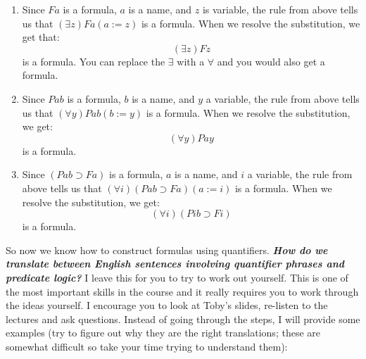 \documentclass[
]{book}
\begin{document}
\begin{enumerate}
\def\labelenumi{\arabic{enumi}.}
\item
  Since \(Fa\) is a formula, \(a\) is a name, and \(z\) is variable, the rule from above tells us that \((\exists z)Fa(a:=z)\) is a formula. When we resolve the substitution, we get that:
  \[
  (\exists z)Fz
  \]
  is a formula. You can replace the \(\exists\) with a \(\forall\) and you would also get a formula.
\item
  Since \(Pab\) is a formula, \(b\) is a name, and \(y\) a variable, the rule from above tells us that \((\forall y)Pab(b:=y)\) is a formula. When we resolve the substitution, we get:
  \[
  (\forall y)Pay
  \]
  is a formula.
\item
  Since \((Pab \supset Fa)\) is a formula, \(a\) is a name, and \(i\) a variable, the rule from above tells us that \((\forall i)(Pab\supset Fa)(a:=i)\) is a formula. When we resolve the substitution, we get:
  \[
  (\forall i)(Pib \supset Fi)
  \]
  is a formula.
\end{enumerate}

So now we know how to construct formulas using quantifiers. \textbf{\emph{How do we translate between English sentences involving quantifier phrases and predicate logic?}} I leave this for you to try to work out yourself. This is one of the most important skills in the course and it really requires you to work through the ideas yourself. I encourage you to look at Toby's slides, re-listen to the lectures and ask questions. Instead of going through the steps, I will provide some examples (try to figure out why they are the right translations; these are somewhat difficult so take your time trying to understand them):
\end{document}
